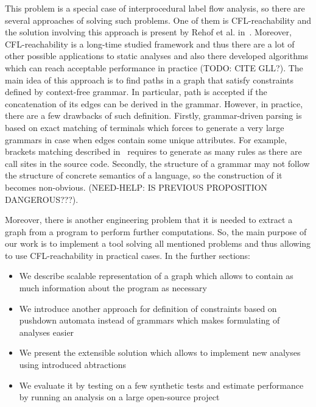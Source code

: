 This problem is a special case of interprocedural label flow analysis, so there are several approaches of solving such problems.
One of them is CFL-reachability and the solution involving this approach is present by Rehof et al. in~\cite{CFLr}.
Moreover, CFL-reachability is a long-time studied framework and thus there are a lot of other possible applications to static analyses and also there developed algorithms which can reach acceptable performance in practice (TODO: CITE GLL?).
The main idea of this approach is to find paths in a graph that satisfy constraints defined by context-free grammar.
In particular, path is accepted if the concatenation of its edges can be derived in the grammar.
However, in practice, there are a few drawbacks of such definition.
Firstly, grammar-driven parsing is based on exact matching of terminals which forces to generate a very large grammars in case when edges contain some unique attributes.
For example, brackets matching described in~\cite{CFLr} requires to generate as many rules as there are call sites in the source code.
Secondly, the structure of a grammar may not follow the structure of concrete semantics of a language, so the construction of it becomes non-obvious. (NEED-HELP: IS PREVIOUS PROPOSITION DANGEROUS???).

Moreover, there is another engineering problem that it is needed to extract a graph from a program to perform further computations.
So, the main purpose of our work is to implement a tool solving all mentioned problems and thus allowing to use CFL-reachability in practical cases.
In the further sections: 
\begin{itemize}
	\item We describe scalable representation of a graph which allows to contain as much information about the program as necessary
	\item We introduce another approach for definition of constraints based on pushdown automata instead of grammars which makes formulating of analyses easier
	\item We present the extensible solution which allows to implement new analyses using introduced abtractions
	\item We evaluate it by testing on a few synthetic tests and estimate performance by running an analysis on a large open-source project
\end{itemize}

